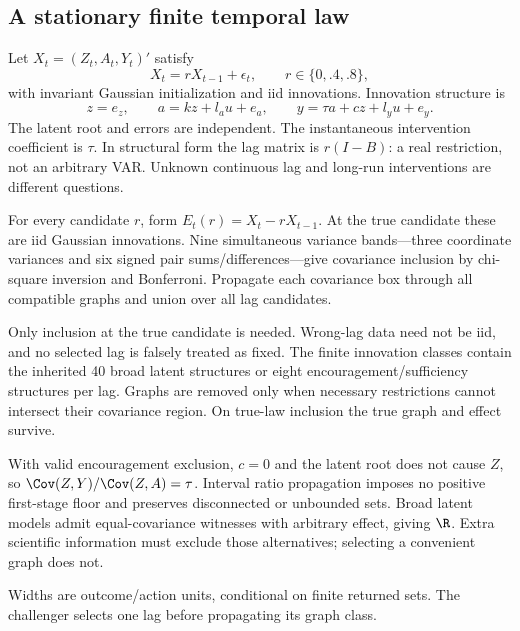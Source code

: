 \subsection{A stationary finite temporal law}
Let $X_t=(Z_t,A_t,Y_t)'$ satisfy
\[
 X_t=rX_{t-1}+\epsilon_t,\qquad r\in\{0,.4,.8\},
\]
with invariant Gaussian initialization and iid innovations. Innovation structure is
\[
 z=e_z,\qquad a=kz+l_au+e_a,\qquad y=\tau a+cz+l_yu+e_y.
\]
The latent root and errors are independent. The instantaneous intervention coefficient is $\tau$. In structural form the lag matrix is $r(I-B)$: a real restriction, not an arbitrary VAR. Unknown continuous lag and long-run interventions are different questions.

For every candidate $r$, form $E_t(r)=X_t-rX_{t-1}$. At the true candidate these are iid Gaussian innovations. Nine simultaneous variance bands---three coordinate variances and six signed pair sums/differences---give covariance inclusion by chi-square inversion and Bonferroni. Propagate each covariance box through all compatible graphs and union over all lag candidates.

Only inclusion at the true candidate is needed. Wrong-lag data need not be iid, and no selected lag is falsely treated as fixed. The finite innovation classes contain the inherited 40 broad latent structures or eight encouragement/sufficiency structures per lag. Graphs are removed only when necessary restrictions cannot intersect their covariance region. On true-law inclusion the true graph and effect survive.

With valid encouragement exclusion, $c=0$ and the latent root does not cause $Z$, so $\Cov(Z,Y)/\Cov(Z,A)=\tau$. Interval ratio propagation imposes no positive first-stage floor and preserves disconnected or unbounded sets. Broad latent models admit equal-covariance witnesses with arbitrary effect, giving $\R$. Extra scientific information must exclude those alternatives; selecting a convenient graph does not.

Widths are outcome/action units, conditional on finite returned sets. The challenger selects one lag before propagating its graph class.

